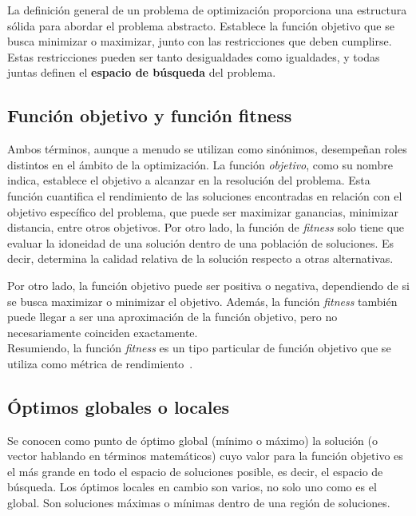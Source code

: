 La definición general de un problema de optimización proporciona una estructura sólida para abordar el problema abstracto. Establece la función objetivo que se busca minimizar o maximizar, junto con las restricciones que deben cumplirse. Estas restricciones pueden ser tanto desigualdades como igualdades, y todas juntas definen el \textbf{espacio de búsqueda} del problema.

\subsection{Función objetivo y función fitness}
Ambos términos, aunque a menudo se utilizan como sinónimos, desempeñan roles distintos en el ámbito de la optimización. La función \textit{objetivo}, como su nombre indica, establece el objetivo a alcanzar en la resolución del problema. Esta función cuantifica el rendimiento de las soluciones encontradas en relación con el objetivo específico del problema, que puede ser maximizar ganancias, minimizar distancia, entre otros objetivos. Por otro lado, la función de \textit{fitness} solo tiene que evaluar la idoneidad de una solución dentro de una población de soluciones. Es decir, determina la calidad relativa de la solución respecto a otras alternativas.

Por otro lado, la función objetivo puede ser positiva o negativa, dependiendo de si se busca maximizar o minimizar el objetivo. Además, la función \textit{fitness} también puede llegar a ser una aproximación de la función objetivo, pero no necesariamente coinciden exactamente.\\[6pt]
Resumiendo, la función \textit{fitness} es un tipo particular de función objetivo que se utiliza como métrica de rendimiento~\cite{eiben2015}.

\subsection{Óptimos globales o locales}
Se conocen como punto de óptimo global (mínimo o máximo) la solución (o vector hablando en términos matemáticos) cuyo valor para la función objetivo es el más grande en todo el espacio de soluciones posible, es decir, el espacio de búsqueda. Los óptimos locales en cambio son varios, no solo uno como es el global. Son soluciones máximas o mínimas dentro de una región de soluciones.

